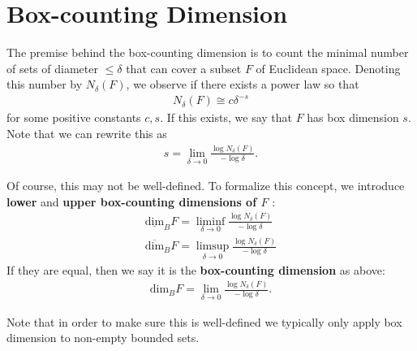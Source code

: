 \documentclass{memoir}
\begin{document}


\chapter{Box-counting Dimension}
\label{cha:box_counting_dimension}

The premise behind the box-counting dimension is to count the minimal number of sets of diameter \(\leq \delta\) that can cover a subset \(F\) of Euclidean space. Denoting this number by \(N_{\delta}(F)\), we observe if there exists a power law so that
\begin{align*}
	N_{\delta}(F) \cong c \delta^{-s}
\end{align*}
for some positive constants \(c,s\). If this exists, we say that \(F\) has box dimension \(s\). Note that we can rewrite this as
\begin{align*}
	s = \lim_{\delta \to 0} \frac{\log N_{\delta}(F)}{-\log \delta}.
\end{align*}

\begin{defn}
Of course, this may not be well-defined. To formalize this concept, we introduce \textbf{lower} and \textbf{upper box-counting dimensions of \(F\)} :
\begin{align*}
	\underline{ \textrm{dim}}_{B}F = \liminf_{\delta \to 0} \frac{\log N_{\delta}(F)}{-\log \delta}\\
	\overline{ \textrm{dim}}_{B}F = \limsup_{\delta \to 0} \frac{\log N_\delta(F)}{-\log \delta}
\end{align*}
If they are equal, then we say it is the \textbf{box-counting dimension} as above:
\begin{align*}
	\textrm{dim}_B F = \lim_{\delta \to 0} \frac{\log N_\delta(F)}{-\log \delta}.
\end{align*}
\end{defn}

Note that in order to make sure this is well-defined we typically only apply box dimension to non-empty bounded sets.\\
\end{document}
